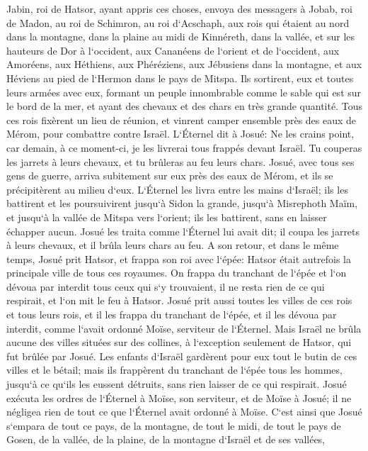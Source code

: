 \verse Jabin, roi de Hatsor, ayant appris ces choses, envoya des messagers à Jobab, roi de Madon, au roi de Schimron, au roi d`Acschaph, 
\verse aux rois qui étaient au nord dans la montagne, dans la plaine au midi de Kinnéreth, dans la vallée, et sur les hauteurs de Dor à l`occident, 
\verse aux Cananéens de l`orient et de l`occident, aux Amoréens, aux Héthiens, aux Phéréziens, aux Jébusiens dans la montagne, et aux Héviens au pied de l`Hermon dans le pays de Mitspa. 
\verse Ils sortirent, eux et toutes leurs armées avec eux, formant un peuple innombrable comme le sable qui est sur le bord de la mer, et ayant des chevaux et des chars en très grande quantité. 
\verse Tous ces rois fixèrent un lieu de réunion, et vinrent camper ensemble près des eaux de Mérom, pour combattre contre Israël. 
\verse L`Éternel dit à Josué: Ne les crains point, car demain, à ce moment-ci, je les livrerai tous frappés devant Israël. Tu couperas les jarrets à leurs chevaux, et tu brûleras au feu leurs chars. 
\verse Josué, avec tous ses gens de guerre, arriva subitement sur eux près des eaux de Mérom, et ils se précipitèrent au milieu d`eux. 
\verse L`Éternel les livra entre les mains d`Israël; ils les battirent et les poursuivirent jusqu`à Sidon la grande, jusqu`à Misrephoth Maïm, et jusqu`à la vallée de Mitspa vers l`orient; ils les battirent, sans en laisser échapper aucun. 
\verse Josué les traita comme l`Éternel lui avait dit; il coupa les jarrets à leurs chevaux, et il brûla leurs chars au feu. 
\verse A son retour, et dans le même temps, Josué prit Hatsor, et frappa son roi avec l`épée: Hatsor était autrefois la principale ville de tous ces royaumes. 
\verse On frappa du tranchant de l`épée et l`on dévoua par interdit tous ceux qui s`y trouvaient, il ne resta rien de ce qui respirait, et l`on mit le feu à Hatsor. 
\verse Josué prit aussi toutes les villes de ces rois et tous leurs rois, et il les frappa du tranchant de l`épée, et il les dévoua par interdit, comme l`avait ordonné Moïse, serviteur de l`Éternel. 
\verse Mais Israël ne brûla aucune des villes situées sur des collines, à l`exception seulement de Hatsor, qui fut brûlée par Josué. 
\verse Les enfants d`Israël gardèrent pour eux tout le butin de ces villes et le bétail; mais ils frappèrent du tranchant de l`épée tous les hommes, jusqu`à ce qu`ils les eussent détruits, sans rien laisser de ce qui respirait. 
\verse Josué exécuta les ordres de l`Éternel à Moïse, son serviteur, et de Moïse à Josué; il ne négligea rien de tout ce que l`Éternel avait ordonné à Moïse. 
\verse C`est ainsi que Josué s`empara de tout ce pays, de la montagne, de tout le midi, de tout le pays de Gosen, de la vallée, de la plaine, de la montagne d`Israël et de ses vallées, 
